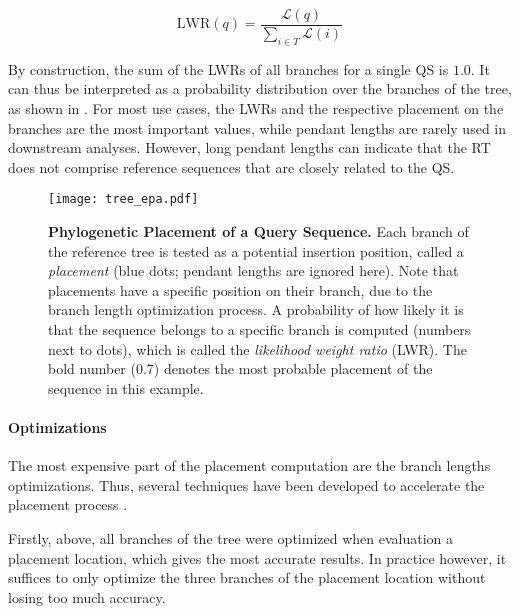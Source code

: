 \begin{equation}
    \label{ch:Foundations:sec:PhylogeneticPlacement:eq:LWR}
    \mbox{LWR}(q) =  \frac{ \mathcal{L}( q )}{ \sum_{i \in T} \mathcal{L}( i )}
\end{equation}

By construction, the sum of the \acp{LWR} of all branches for a single \ac{QS} is $1.0$.
It can thus be interpreted as a probability distribution over the branches of the tree,
as shown in .
For most use cases, the \acp{LWR} and the respective placement on the branches are the most important values,
while pendant lengths are rarely used in downstream analyses.
However, long pendant lengths can indicate that the \ac{RT} does not comprise reference sequences
that are closely related to the \ac{QS}.

\begin{figure}[hpbt]
    \centering
    \texttt{[image: tree\_epa.pdf]}
    \caption[Phylogenetic Placement of a Query Sequence]{
        \textbf{Phylogenetic Placement of a Query Sequence.}
        Each branch of the reference tree is tested as a potential insertion position, called a \emph{placement}
        (blue dots; pendant lengths are ignored here).
        Note that placements have a specific position on their branch, due to the branch length optimization process.
        A probability of how likely it is that the sequence belongs to a specific branch is computed
        (numbers next to dots),
        which is called the \emph{likelihood weight ratio} (LWR).
        The bold number (0.7) denotes the most probable placement of the sequence in this example.
    }
    \label{fig:tree_epa}
\end{figure}

\paragraph{Optimizations}
\label{ch:Foundations:sec:PhylogeneticPlacement:sub:PipelineAndComputation:par:Optimizations}

The most expensive part of the placement computation are the branch lengths optimizations.
Thus, several techniques have been developed to accelerate the placement process \cite{Barbera2018}.

Firstly, above, all branches of the tree were optimized when evaluation a placement location,
which gives the most accurate results.
In practice however, it suffices to only optimize the three branches of the placement location
without losing too much accuracy.


